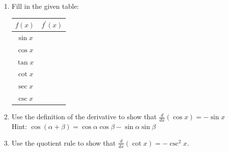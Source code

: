 \documentclass[12pt]{article}
\newif\ifans
\begin{document}
\begin{enumerate}

\item Fill in the given table:

\begin{center}
\begin{tabular}{c|c}
$f(x)$ & $f^{\prime}(x)$\\
\hline
$\sin{x}$ &  \\
\hline
$\cos{x}$ & \\
\hline
$\tan{x}$ & \\
\hline
$\cot{x}$ & \\
\hline
$\sec{x}$ & \\
\hline
$\csc{x}$ & 
\end{tabular}
\end{center}

\ifans{\fbox{
\begin{tabular}{c|c}
$f(x)$ & $f^{\prime}(x)$\\
\hline
$\sin{x}$ & $\cos{x}$  \\
\hline
$\cos{x}$ & $-\sin{x}$ \\
\hline
$\tan{x}$ & $\sec^2{x}$\\
\hline
$\cot{x}$ & $-\csc^2{x}$\\
\hline
$\sec{x}$ & $\sec{x}\tan{x}$\\
\hline
$\csc{x}$ & $-\csc{x}\cot{x}$ 
\end{tabular}
}} \fi

\item Use the definition of the derivative to show that $\frac{d}{dx}(\cos{x})=-\sin{x}$\\
Hint: $\cos{(\alpha + \beta)}=\cos{\alpha}\cos{\beta}-\sin{\alpha}\sin{\beta}$

\ifans{\fbox{\parbox{0.5\linewidth}{
\begin{align*}
\frac{d}{dx}(\cos{x})&=\lim_{h \rightarrow 0}{\frac{\cos{(x+h)}-\cos{x}}{h}}\\
&=\lim_{h \rightarrow 0}{\frac{\cos{x}\cos{h}-\sin{x}\sin{h}-\cos{x}}{h}}\\
&=\lim_{h \rightarrow 0}{\left(\frac{\cos{x}\cos{h}-\cos{x}}{h}-\frac{\sin{x}\sin{h}}{h}\right)}\\
&=\lim_{h \rightarrow 0}{\left(\cos{x}\frac{\cos{h}-1}{h}-\sin{x}\frac{\sin{h}}{h}\right)}\\
&=(\cos{x})(0)-(\sin{x})(1)\\
&=-\sin{x}
\end{align*}
}}} \fi

\item Use the quotient rule to show that $\frac{d}{dx}(\cot{x})=-\csc^2{x}$.


\end{enumerate}
\end{document}
